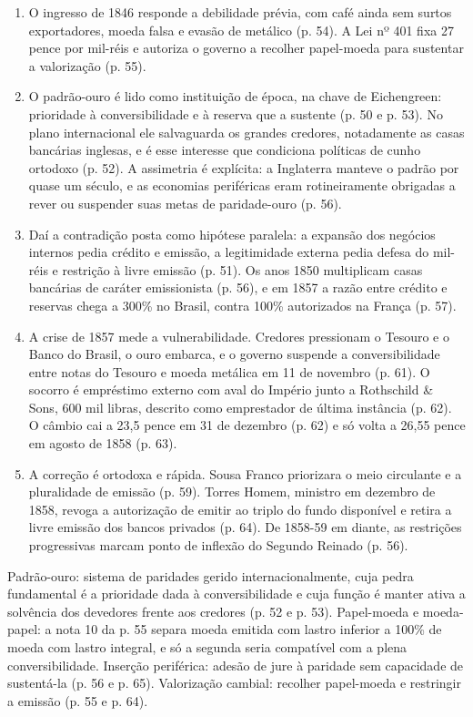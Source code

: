 \begin{enumerate}[nosep]
\item O ingresso de 1846 responde a debilidade prévia, com café ainda sem surtos exportadores, moeda falsa e evasão de metálico (p. 54). A Lei nº 401 fixa 27 pence por mil-réis e autoriza o governo a recolher papel-moeda para sustentar a valorização (p. 55).
\item O padrão-ouro é lido como instituição de época, na chave de Eichengreen: prioridade à conversibilidade e à reserva que a sustente (p. 50 e p. 53). No plano internacional ele salvaguarda os grandes credores, notadamente as casas bancárias inglesas, e é esse interesse que condiciona políticas de cunho ortodoxo (p. 52). A assimetria é explícita: a Inglaterra manteve o padrão por quase um século, e as economias periféricas eram rotineiramente obrigadas a rever ou suspender suas metas de paridade-ouro (p. 56).
\item Daí a contradição posta como hipótese paralela: a expansão dos negócios internos pedia crédito e emissão, a legitimidade externa pedia defesa do mil-réis e restrição à livre emissão (p. 51). Os anos 1850 multiplicam casas bancárias de caráter emissionista (p. 56), e em 1857 a razão entre crédito e reservas chega a 300\% no Brasil, contra 100\% autorizados na França (p. 57).
\item A crise de 1857 mede a vulnerabilidade. Credores pressionam o Tesouro e o Banco do Brasil, o ouro embarca, e o governo suspende a conversibilidade entre notas do Tesouro e moeda metálica em 11 de novembro (p. 61). O socorro é empréstimo externo com aval do Império junto a Rothschild \& Sons, 600 mil libras, descrito como emprestador de última instância (p. 62). O câmbio cai a 23,5 pence em 31 de dezembro (p. 62) e só volta a 26,55 pence em agosto de 1858 (p. 63).
\item A correção é ortodoxa e rápida. Sousa Franco priorizara o meio circulante e a pluralidade de emissão (p. 59). Torres Homem, ministro em dezembro de 1858, revoga a autorização de emitir ao triplo do fundo disponível e retira a livre emissão dos bancos privados (p. 64). De 1858-59 em diante, as restrições progressivas marcam ponto de inflexão do Segundo Reinado (p. 56).
\end{enumerate}

Padrão-ouro: sistema de paridades gerido internacionalmente, cuja pedra fundamental é a prioridade dada à conversibilidade e cuja função é manter ativa a solvência dos devedores frente aos credores (p. 52 e p. 53). Papel-moeda e moeda-papel: a nota 10 da p. 55 separa moeda emitida com lastro inferior a 100\% de moeda com lastro integral, e só a segunda seria compatível com a plena conversibilidade. Inserção periférica: adesão de jure à paridade sem capacidade de sustentá-la (p. 56 e p. 65). Valorização cambial: recolher papel-moeda e restringir a emissão (p. 55 e p. 64).

